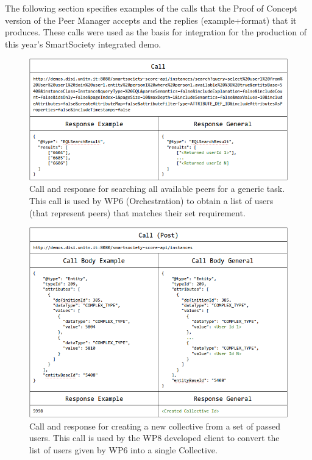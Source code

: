 The following section specifies examples of the calls that the Proof of Concept version of the  Peer Manager accepts and the replies (example+format) that it produces. These calls were used as the basis for integration for the production of this year's SmartSociety integrated demo.

\begin{figure}[htb!]
\centering
\includegraphics[width=1\linewidth]{figures/Peer-search.png}
\caption{Call and response for searching all available peers for a generic task. This call is used by WP6 (Orchestration) to obtain a list of users (that represent peers) that matches their set requirement.}
\label{fig:Peer-search}
\end{figure}

\begin{figure}[htb!]
\centering
\includegraphics[width=1\linewidth]{figures/Collective-create.png}
\caption{Call and response for creating a new collective from a set of passed users. This call is used by the WP8 developed client to convert the list of users given by WP6 into a single Collective.}
\label{fig:Collective-create}
\end{figure}

